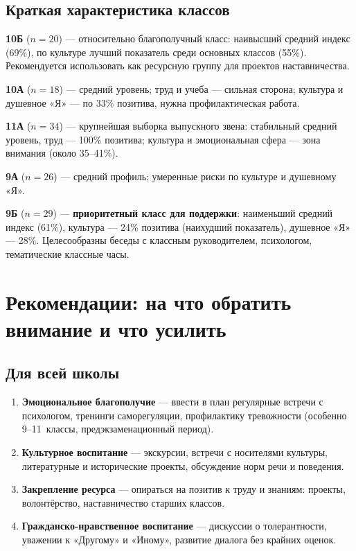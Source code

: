 \documentclass[12pt,a4paper]{article}
\begin{document}
\subsection{Краткая характеристика классов}

\textbf{10Б} ($n=20$) --- относительно благополучный класс: наивысший средний индекс (69\%), по культуре лучший показатель среди основных классов (55\%). Рекомендуется использовать как ресурсную группу для проектов наставничества.

\textbf{10А} ($n=18$) --- средний уровень; труд и учеба --- сильная сторона; культура и душевное «Я» --- по 33\% позитива, нужна профилактическая работа.

\textbf{11А} ($n=34$) --- крупнейшая выборка выпускного звена: стабильный средний уровень, труд --- 100\% позитива; культура и эмоциональная сфера --- зона внимания (около 35--41\%).

\textbf{9А} ($n=26$) --- средний профиль; умеренные риски по культуре и душевному «Я».

\textbf{9Б} ($n=29$) --- \textbf{приоритетный класс для поддержки}: наименьший средний индекс (61\%), культура --- 24\% позитива (наихудший показатель), душевное «Я» --- 28\%. Целесообразны беседы с классным руководителем, психологом, тематические классные часы.

\section{Рекомендации: на что обратить внимание и что усилить}

\subsection{Для всей школы}

\begin{enumerate}
    \item \textbf{Эмоциональное благополучие} --- ввести в план регулярные встречи с психологом, тренинги саморегуляции, профилактику тревожности (особенно 9--11~классы, предэкзаменационный период).
    \item \textbf{Культурное воспитание} --- экскурсии, встречи с носителями культуры, литературные и исторические проекты, обсуждение норм речи и поведения.
    \item \textbf{Закрепление ресурса} --- опираться на позитив к труду и знаниям: проекты, волонтёрство, наставничество старших классов.
    \item \textbf{Гражданско-нравственное воспитание} --- дискуссии о толерантности, уважении к «Другому» и «Иному», развитие диалога без крайних оценок.
\end{enumerate}
\end{document}
